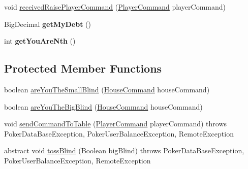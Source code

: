 \begin{DoxyCompactItemize}
\item 
void \hyperlink{classhu_1_1elte_1_1bfw1p6_1_1poker_1_1client_1_1model_1_1_abstract_main_game_model_a8427999a88739707c45dd49e82e28da5}{received\+Raise\+Player\+Command} (\hyperlink{classhu_1_1elte_1_1bfw1p6_1_1poker_1_1command_1_1_player_command}{Player\+Command} player\+Command)
\item 
\hypertarget{classhu_1_1elte_1_1bfw1p6_1_1poker_1_1client_1_1model_1_1_abstract_main_game_model_a1b75f71f7aa7f258d25cc9daf1ae0254}{}Big\+Decimal {\bfseries get\+My\+Debt} ()\label{classhu_1_1elte_1_1bfw1p6_1_1poker_1_1client_1_1model_1_1_abstract_main_game_model_a1b75f71f7aa7f258d25cc9daf1ae0254}

\item 
\hypertarget{classhu_1_1elte_1_1bfw1p6_1_1poker_1_1client_1_1model_1_1_abstract_main_game_model_abcb21cef4e9a152109e88b18b3d5112a}{}int {\bfseries get\+You\+Are\+Nth} ()\label{classhu_1_1elte_1_1bfw1p6_1_1poker_1_1client_1_1model_1_1_abstract_main_game_model_abcb21cef4e9a152109e88b18b3d5112a}

\end{DoxyCompactItemize}
\subsection*{Protected Member Functions}
\begin{DoxyCompactItemize}
\item 
boolean \hyperlink{classhu_1_1elte_1_1bfw1p6_1_1poker_1_1client_1_1model_1_1_abstract_main_game_model_af371cb4a7241d329b6ef5c323397e032}{are\+You\+The\+Small\+Blind} (\hyperlink{classhu_1_1elte_1_1bfw1p6_1_1poker_1_1command_1_1_house_command}{House\+Command} house\+Command)
\item 
boolean \hyperlink{classhu_1_1elte_1_1bfw1p6_1_1poker_1_1client_1_1model_1_1_abstract_main_game_model_a011be8a1456cf327d97bf5b6d24e7541}{are\+You\+The\+Big\+Blind} (\hyperlink{classhu_1_1elte_1_1bfw1p6_1_1poker_1_1command_1_1_house_command}{House\+Command} house\+Command)
\item 
void \hyperlink{classhu_1_1elte_1_1bfw1p6_1_1poker_1_1client_1_1model_1_1_abstract_main_game_model_aa59fcb7a7612917d5d87c428922f92ca}{send\+Command\+To\+Table} (\hyperlink{classhu_1_1elte_1_1bfw1p6_1_1poker_1_1command_1_1_player_command}{Player\+Command} player\+Command)  throws Poker\+Data\+Base\+Exception, Poker\+User\+Balance\+Exception, Remote\+Exception 
\item 
abstract void \hyperlink{classhu_1_1elte_1_1bfw1p6_1_1poker_1_1client_1_1model_1_1_abstract_main_game_model_ace3849b6ae3aed9d5f67926de0500f84}{toss\+Blind} (Boolean big\+Blind)  throws Poker\+Data\+Base\+Exception, Poker\+User\+Balance\+Exception, Remote\+Exception
\end{DoxyCompactItemize}
